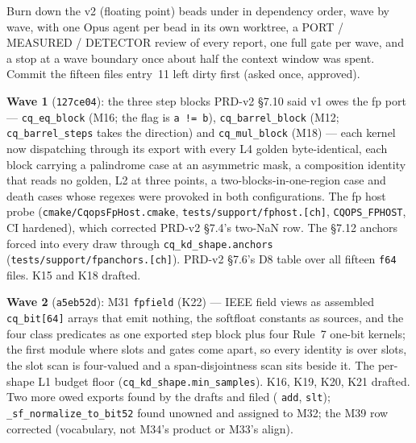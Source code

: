 \begin{generated}
\end{generated}


Burn down the v2 (floating point) beads under  in dependency order, wave by wave, with
one Opus agent per bead in its own worktree, a PORT / MEASURED / DETECTOR review of every report,
one full gate per wave, and a stop at a wave boundary once about half the context window was
spent. Commit the fifteen files entry~11 left dirty first (asked once, approved).

\textbf{Wave 1} (\texttt{127ce04}): the three step blocks PRD-v2 \S7.10 said v1 owes the fp
port --- \texttt{cq\_eq\_block} (M16; the flag is \texttt{a != b}), \texttt{cq\_barrel\_block} (M12;
\texttt{cq\_barrel\_steps} takes the direction) and \texttt{cq\_mul\_block} (M18) --- each kernel now
dispatching through its export with every L4 golden byte-identical, each block carrying a
palindrome case at an asymmetric mask, a composition identity that reads no golden, L2 at three
points, a two-blocks-in-one-region case and death cases whose regexes were provoked in both
configurations. The fp host probe (\texttt{cmake/CqopsFpHost.cmake}, \texttt{tests/support/fphost.[ch]},
\texttt{CQOPS\_FPHOST}, CI hardened), which corrected PRD-v2 \S7.4's two-NaN row. The \S7.12 anchors
forced into every draw through \texttt{cq\_kd\_shape.anchors} (\texttt{tests/support/fpanchors.[ch]}).
PRD-v2 \S7.6's D8 table over all fifteen \texttt{f64} files. K15 and K18 drafted.

\textbf{Wave 2} (\texttt{a5eb52d}): M31 \texttt{fpfield} (K22) --- IEEE field views as assembled
\texttt{cq\_bit[64]} arrays that emit nothing, the softfloat constants as sources, and the four class
predicates as one exported step block plus four Rule~7 one-bit kernels; the first module where slots
and gates come apart, so every identity is over slots, the slot scan is four-valued and a
span-disjointness scan sits beside it. The per-shape L1 budget floor (\texttt{cq\_kd\_shape.min\_samples}).
K16, K19, K20, K21 drafted. Two more owed exports found by the drafts and filed (
\texttt{add},  \texttt{slt}); \texttt{\_sf\_normalize\_to\_bit52} found unowned and
assigned to M32; the M39 row corrected (vocabulary, not M34's product or M33's align).

